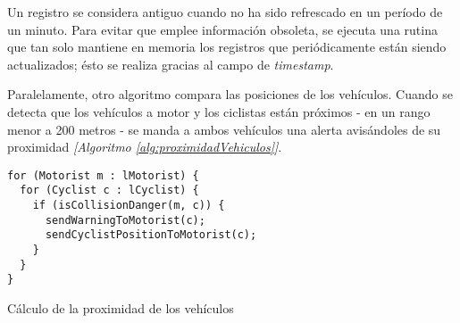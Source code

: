 Un registro se considera antiguo cuando no ha sido refrescado en un período de un
minuto. Para evitar que emplee información obsoleta, se ejecuta una rutina que tan
solo mantiene en memoria los registros que periódicamente están siendo actualizados;
ésto se realiza gracias al campo de \emph{timestamp}.

Paralelamente, otro algoritmo compara las posiciones de los vehículos. Cuando se
detecta que los vehículos a motor y los ciclistas están próximos - en un rango
menor a 200 metros - se manda a ambos vehículos una alerta avisándoles de su proximidad
\emph{[Algoritmo \ref{alg:proximidadVehiculos}]}.

\begin{listing}
	\begin{minipage}{.4\textwidth}
		\begin{verbatim}
for (Motorist m : lMotorist) {
  for (Cyclist c : lCyclist) {
    if (isCollisionDanger(m, c)) {
      sendWarningToMotorist(c);
      sendCyclistPositionToMotorist(c);
    }
  }
}
		\end{verbatim}
	\end{minipage}
	\caption{Cálculo de la proximidad de los vehículos}\label{alg:proximidadVehiculos}
\end{listing}
